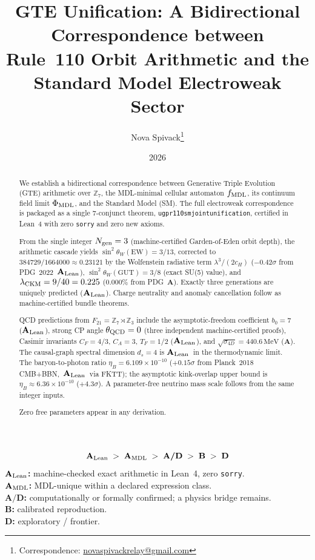 \documentclass[11pt]{article}
\title{\bfseries GTE Unification: A Bidirectional Correspondence between\\[0.3em]
Rule~110 Orbit Arithmetic and the Standard Model Electroweak Sector}
\author[1]{Nova Spivack\thanks{Correspondence:
  \href{mailto:novaspivackrelay@gmail.com}{novaspivackrelay@gmail.com}}}
\affil[1]{Independent Research}
\date{2026}
\theoremstyle{remark}
\newcommand{\ZS}{\mathbb{Z}_7}
\newcommand{\Zthree}{\mathbb{Z}_3}
\newcommand{\Ngen}{N_{\rm gen}}
\newcommand{\fmdl}{f_{\rm MDL}}
\newcommand{\lean}[1]{%
  \penalty-100
  \begingroup\def\_{\textunderscore\allowbreak}\texttt{#1}\endgroup}
\newcommand{\sinwsq}{\sin^2\!\theta_W}
\newcommand{\etaB}{\eta_B}
\newcommand{\phimdl}{\Phi_{\rm MDL}}
\newcommand{\Ftwentyone}{F_{21}}
\newcommand{\CatA}{\textbf{A}}
\newcommand{\CatAL}{\ensuremath{\textbf{A}_{\rm Lean}}}
\newcommand{\CatAMDL}{\ensuremath{\textbf{A}_{\rm MDL}}}
\newcommand{\CatAD}{\textbf{A/D}}
\newcommand{\CatB}{\textbf{B}}
\newcommand{\CatD}{\textbf{D}}
\begin{document}
\maketitle
\NovaZenodoAfterTitle

\begin{abstract}
We establish a bidirectional correspondence between Generative Triple Evolution (GTE)
arithmetic over $\mathbb{Z}_7$, the MDL-minimal cellular automaton $\fmdl$, its
continuum field limit $\phimdl$, and the Standard Model (SM).
The full electroweak correspondence is packaged as a single 7-conjunct theorem,
\lean{ugp\_r110\_sm\_joint\_unification}, certified in Lean~4 with zero
\texttt{sorry} and zero new axioms.

From the single integer $\Ngen = 3$ (machine-certified Garden-of-Eden orbit depth),
the arithmetic cascade yields $\sinwsq(\text{EW}) = 3/13$, corrected to
$384729/1664000 \approx 0.23121$ by the Wolfenstein radiative term $\lambda^3/(2c_H)$
($-0.42\sigma$ from PDG~2022~\CatAL),
$\sinwsq(\text{GUT}) = 3/8$ (exact SU(5) value), and
$\lambda_{\rm CKM} = 9/40 = 0.225$ ($0.000\%$ from PDG~\CatA).
Exactly three generations are uniquely predicted (\CatAL).
Charge neutrality and anomaly cancellation follow as machine-certified bundle theorems.

QCD predictions from $\Ftwentyone = \ZS \rtimes \Zthree$ include
the asymptotic-freedom coefficient $b_0 = 7$ (\CatAL),
strong CP angle $\theta_{\rm QCD} = 0$ (three independent machine-certified proofs),
Casimir invariants $C_F = 4/3$, $C_A = 3$, $T_F = 1/2$ (\CatAL),
and $\sqrt{\sigma_{4D}} = 440.6\,\text{MeV}$ (\CatA).
The causal-graph spectral dimension $d_s = 4$ is \CatAL\ in the thermodynamic limit.
The baryon-to-photon ratio $\etaB = 6.109\times10^{-10}$ ($+0.15\sigma$ from Planck~2018 CMB+BBN,~\CatAL\ via FKTT);
the asymptotic kink-overlap upper bound is $\etaB \approx 6.36\times10^{-10}$ ($+4.3\sigma$).
A parameter-free neutrino mass scale follows from the same integer inputs.

Zero free parameters appear in any derivation.
\end{abstract}

\tableofcontents
\newpage

\begin{tcolorbox}[colback=gray!4,colframe=gray!50!black,
  title={\textbf{Claim-strength taxonomy}},
  fonttitle=\bfseries,left=6pt,right=6pt,top=5pt,bottom=5pt]
\small
\[
\CatAL \;>\; \CatAMDL \;>\; \CatAD \;>\; \CatB \;>\; \CatD
\]
\textbf{$\CatAL$:} machine-checked exact arithmetic in Lean~4, zero \texttt{sorry}.\\
\textbf{$\CatAMDL$:} MDL-unique within a declared expression class.\\
\textbf{$\CatAD$:} computationally or formally confirmed; a physics bridge remains.\\
\textbf{$\CatB$:} calibrated reproduction.\\
\textbf{$\CatD$:} exploratory / frontier.
\end{tcolorbox}
\end{document}
